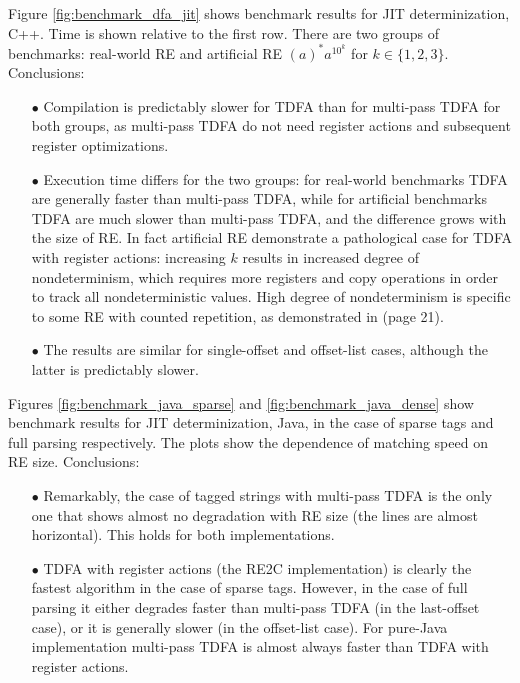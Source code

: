\documentclass[]{article}
\begin{document}
\FloatBarrier

Figure \ref{fig:benchmark_dfa_jit} shows benchmark results for JIT determinization, C++.
Time is shown relative to the first row.
There are two groups of benchmarks: real-world RE and artificial RE $(a)^* a^{10^k}$ for $k \in \{1, 2, 3 \}$.
Conclusions:
\medskip

\begin{itemize}

\item[$\bullet$]
Compilation is predictably slower for TDFA than for multi-pass TDFA for both groups,
as multi-pass TDFA do not need register actions and subsequent register optimizations.
\medskip

\item[$\bullet$]
Execution time differs for the two groups:
for real-world benchmarks TDFA are generally faster than multi-pass TDFA,
while for artificial benchmarks TDFA are much slower than multi-pass TDFA, and the difference grows with the size of RE.
In fact artificial RE demonstrate a pathological case for TDFA with register actions:
increasing $k$ results in increased degree of nondeterminism,
which requires more registers and copy operations in order to track all nondeterministic values.
High degree of nondeterminism is specific to some RE with counted repetition, as demonstrated in \cite{Tro17} (page 21).
\medskip

\item[$\bullet$]
The results are similar for single-offset and offset-list cases,
although the latter is predictably slower.
\medskip

\end{itemize}

\medskip

Figures \ref{fig:benchmark_java_sparse} and \ref{fig:benchmark_java_dense} show benchmark results for JIT determinization, Java,
in the case of sparse tags and full parsing respectively.
The plots show the dependence of matching speed on RE size.
Conclusions:
\medskip
\begin{itemize}

\item[$\bullet$]
Remarkably, the case of tagged strings with multi-pass TDFA is the only one that shows almost no degradation with RE size (the lines are almost horizontal).
This holds for both implementations.
\medskip

\item[$\bullet$]
TDFA with register actions (the RE2C implementation) is clearly the fastest algorithm in the case of sparse tags.
However, in the case of full parsing it either degrades faster than multi-pass TDFA (in the last-offset case),
or it is generally slower (in the offset-list case).
For pure-Java implementation multi-pass TDFA is almost always faster than TDFA with register actions.
\medskip

\end{itemize}
\end{document}

